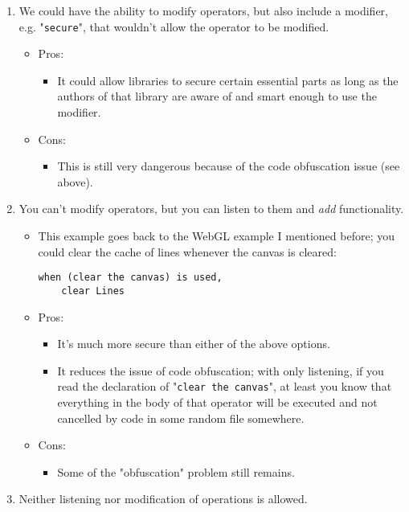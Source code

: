 \documentclass{article}
\begin{document}
\begin{enumerate}
\begin{itemize}
	\end{itemize}
	\item We could have the ability to modify operators, but also include a modifier, e.g. "\texttt{secure}", that wouldn't allow the operator to be modified.
	\begin{itemize}
		\item Pros:
		\begin{itemize}
			\item It could allow libraries to secure certain essential parts as long as the authors of that library are aware of and smart enough to use the modifier.
		\end{itemize}
		\item Cons:
		\begin{itemize}
			\item This is still very dangerous because of the code obfuscation issue (see above).
		\end{itemize}
	\end{itemize}
	\item You can't modify operators, but you can listen to them and \emph{add} functionality.
	\begin{itemize}
		\item This example goes back to the WebGL example I mentioned before; you could clear the cache of lines whenever the canvas is cleared:
			\begin{lstlisting}
when (clear the canvas) is used,
	clear Lines
			\end{lstlisting}
		\item Pros:
		\begin{itemize}
			\item It's much more secure than either of the above options.
			\item It reduces the issue of code obfuscation; with only listening, if you read the declaration of "\texttt{clear the canvas}", at least you know that everything in the body of that operator will be executed and not cancelled by code in some random file somewhere.
		\end{itemize}
		\item Cons:
		\begin{itemize}
			\item Some of the "obfuscation" problem still remains.
		\end{itemize}
	\end{itemize}
	\item Neither listening nor modification of operations is allowed.
	\begin{itemize}

\end{itemize}
\end{enumerate}
\end{document}
